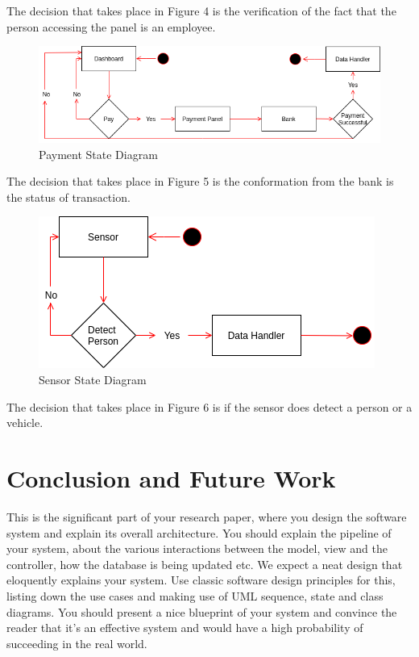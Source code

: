 \documentclass[10pt,twocolumn,letterpaper]{article}
\begin{document}
\noindent The decision that takes place in Figure 4 is the verification of the fact 
that the person accessing the panel is an employee.\\
\begin{figure}[h]
    \centering
    \includegraphics[scale=0.3]{img/State Diagram3.png}    
    \caption{Payment State Diagram}
\end{figure}

\noindent The decision that takes place in Figure 5 is the conformation from the 
bank is the status of transaction.\\ 
\begin{figure}[h]
    \centering
    \includegraphics[scale=0.3]{img/State Diagram4.png}    
    \caption{Sensor State Diagram}
\end{figure}

\noindent The decision that takes place in Figure 6 is if the sensor does detect 
a person or a vehicle.
\section*{Conclusion and Future Work}
This is the significant part of your research paper, where you design the 
software system and explain its overall architecture. You should explain 
the pipeline of your system, about the various interactions between the model, 
view and the controller, how the database is being updated etc. We expect a neat 
design that eloquently explains your system. Use classic software design principles 
for this, listing down the use cases and making use of UML sequence, state and 
class diagrams. You should present a nice blueprint of your system and convince 
the reader that it’s an effective system and would have a high probability of 
succeeding in the real world.
\end{document}
